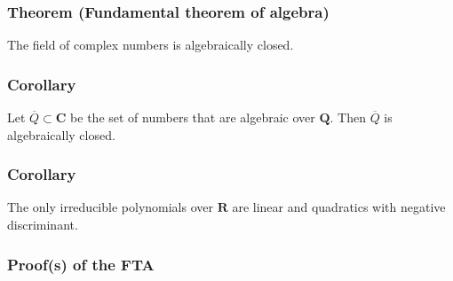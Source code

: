 \documentclass[11pt]{article}
\begin{document}
\subsubsection{Theorem (Fundamental theorem of algebra)}
\label{sec:org4830d2e}
The field of complex numbers is algebraically closed.
\subsubsection{Corollary}
\label{sec:org5d7ec11}
Let \(\overline Q \subset \mathbf{C}\) be the set of numbers that are algebraic over \(\mathbf{Q}\).
Then \(\overline Q\) is algebraically closed.
\subsubsection{Corollary}
\label{sec:orgbc4a534}
The only irreducible polynomials over \(\mathbf{R}\) are linear and quadratics with negative discriminant.
\subsubsection{Proof(s) of the FTA}
\label{sec:org436fb6b}
\end{document}
